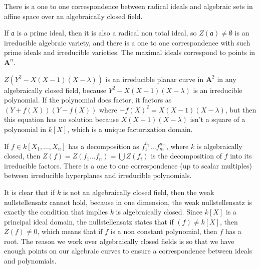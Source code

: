 \begin{corollary}
    There is a one to one correspondence between radical ideals and algebraic sets in affine space over an algebraically closed field.
\end{corollary}

\begin{corollary}
    If $\mathfrak{a}$ is a prime ideal, then it is also a radical non total ideal, so $Z(\mathfrak{a}) \neq \emptyset$ is an irreducible algebraic variety, and there is a one to one correspondence with such prime ideals and irreducible varieties. The maximal ideals correspond to points in $\mathbf{A}^n$.
\end{corollary}

\begin{example}
    $Z(Y^2 - X(X-1)(X-\lambda))$ is an irreducible planar curve in $\mathbf{A}^2$ in any algebraically closed field, because $Y^2 - X(X-1)(X-\lambda)$ is an irreducible polynomial. If the polynomial does factor, it factors as $(Y + f(X))(Y - f(X))$ where $-f(X)^2 = X(X-1)(X-\lambda)$, but then this equation has no solution because $X(X-1)(X-\lambda)$ isn't a square of a polynomial in $k[X]$, which is a unique factorization domain.
\end{example}

\begin{corollary}
    If $f \in k[X_1, \dots, X_n]$ has a decomposition as $f_1^{n_1} \dots f_m^{n_m}$, where $k$ is algebraically closed, then $Z(f) = Z(f_1 \dots f_n) = \bigcup Z(f_i)$ is the decomposition of $f$ into its irreducible factors. There is a one to one correspondence (up to scalar multiples) between irreducible hyperplanes and irreducible polynomials.
\end{corollary}

It is clear that if $k$ is not an algebraically closed field, then the weak nullstellensatz cannot hold, because in one dimension, the weak nullstellensatz is exactly the condition that implies $k$ is algebraically closed. Since $k[X]$ is a principal ideal domain, the nullstellensatz states that if $(f) \neq k[X]$, then $Z(f) \neq 0$, which means that if $f$ is a non constant polynomial, then $f$ has a root.  The reason we work over algebraically closed fields is so that we have enough points on our algebraic curves to ensure a correspondence between ideals and polynomials.


